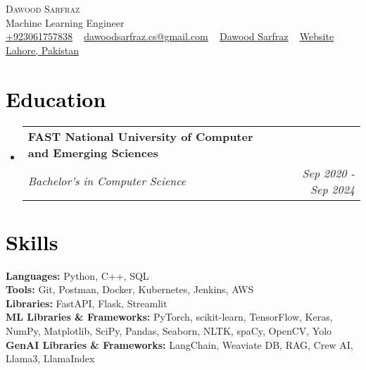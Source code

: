 \documentclass[letterpaper,11pt]{article}
\makeatletter
\newcommand{\resumeSubheading}[4]{
	\vspace{-2pt}\item
	\begin{tabular*}{1.0\textwidth}[t]{l@{\extracolsep{\fill}}r}
		\textbf{\large#1} & \textbf{\small #2} \\
		\textit{\large#3} & \textit{\small #4} \\
		
	\end{tabular*}\vspace{-7pt}
}
\newcommand{\resumeSubHeadingListStart}{\begin{itemize}[leftmargin=0.0in, label={}]}
\newcommand{\resumeSubHeadingListEnd}{\end{itemize}}
\makeatother
\begin{document}
	
	
	
	\begin{center}
		{\Huge \scshape Dawood Sarfraz} \\ \vspace{5pt}
		{\Large{Machine Learning Engineer}} \\ \vspace{5pt}
		\small 
		\href{tel:+9203061757838}{\raisebox{-0.1\height}{\faPhone} \underline{{+923061757838}}} ~ 
		\href{mailto:dawoodsarfraz.cs@gmail.com}{\raisebox{-0.2\height}{\faEnvelope} \underline{{dawoodsarfraz.cs@gmail.com}}} ~ 
		\href{https://linkedin.com/in/dawood-sarfraz-0466541b6}{\raisebox{-0.2\height}{\faLinkedin}  \underline{{Dawood Sarfraz}}} ~
		\href{https://dawoodsarfraz.github.io/web/}{\raisebox{-0.2\height}{\faGlobe} \underline{{Website}}}
		~ 
		\href{https://maps.app.goo.gl/DdjDSuGCuwkG288CA}{ \underline{{Lahore, Pakistan}}} 
		\vspace{-5pt}
	\end{center}
	
	
	\section{\textcolor{black}{Education}}
	\resumeSubHeadingListStart
	\resumeSubheading
	{FAST National University of Computer and Emerging Sciences}{}
	{Bachelor's in Computer Science }{Sep 2020 - Sep 2024}
	\resumeSubHeadingListEnd
	\vspace{-10pt}

	\section{\textcolor{black}{Skills}}
	\begin{itemize}[leftmargin=0.01in, label={}]
		{\item{
				\textbf{\normalsize{Languages:}}{ \normalsize{Python, C++, SQL}} \\
				\textbf{\normalsize{Tools:}}{ \normalsize{Git, Postman, Docker, Kubernetes, Jenkins, AWS}} \\	
				\textbf{\normalsize{Libraries:}}{ \normalsize{FastAPI, Flask, Streamlit}}\\	
				\textbf{\normalsize{ML Libraries \& Frameworks:}}{ \normalsize{PyTorch, scikit-learn, TensorFlow, Keras, NumPy, Matplotlib, SciPy, Pandas, Seaborn, NLTK, spaCy, OpenCV, Yolo}} \\
				\textbf{\normalsize{GenAI Libraries \& Frameworks:}}{ \normalsize{LangChain, Weaviate DB, RAG, Crew AI, Llama3, LlamaIndex}} \\
		}}
	\end{itemize}
	\vspace{-10pt}
	
\end{document}
